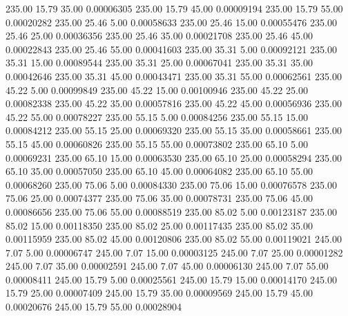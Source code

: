     235.00     15.79     35.00     0.00006305
    235.00     15.79     45.00     0.00009194
    235.00     15.79     55.00     0.00020282
    235.00     25.46      5.00     0.00058633
    235.00     25.46     15.00     0.00055476
    235.00     25.46     25.00     0.00036356
    235.00     25.46     35.00     0.00021708
    235.00     25.46     45.00     0.00022843
    235.00     25.46     55.00     0.00041603
    235.00     35.31      5.00     0.00092121
    235.00     35.31     15.00     0.00089544
    235.00     35.31     25.00     0.00067041
    235.00     35.31     35.00     0.00042646
    235.00     35.31     45.00     0.00043471
    235.00     35.31     55.00     0.00062561
    235.00     45.22      5.00     0.00099849
    235.00     45.22     15.00     0.00100946
    235.00     45.22     25.00     0.00082338
    235.00     45.22     35.00     0.00057816
    235.00     45.22     45.00     0.00056936
    235.00     45.22     55.00     0.00078227
    235.00     55.15      5.00     0.00084256
    235.00     55.15     15.00     0.00084212
    235.00     55.15     25.00     0.00069320
    235.00     55.15     35.00     0.00058661
    235.00     55.15     45.00     0.00060826
    235.00     55.15     55.00     0.00073802
    235.00     65.10      5.00     0.00069231
    235.00     65.10     15.00     0.00063530
    235.00     65.10     25.00     0.00058294
    235.00     65.10     35.00     0.00057050
    235.00     65.10     45.00     0.00064082
    235.00     65.10     55.00     0.00068260
    235.00     75.06      5.00     0.00084330
    235.00     75.06     15.00     0.00076578
    235.00     75.06     25.00     0.00074377
    235.00     75.06     35.00     0.00078731
    235.00     75.06     45.00     0.00086656
    235.00     75.06     55.00     0.00088519
    235.00     85.02      5.00     0.00123187
    235.00     85.02     15.00     0.00118350
    235.00     85.02     25.00     0.00117435
    235.00     85.02     35.00     0.00115959
    235.00     85.02     45.00     0.00120806
    235.00     85.02     55.00     0.00119021
    245.00      7.07      5.00     0.00006747
    245.00      7.07     15.00     0.00003125
    245.00      7.07     25.00     0.00001282
    245.00      7.07     35.00     0.00002591
    245.00      7.07     45.00     0.00006130
    245.00      7.07     55.00     0.00008411
    245.00     15.79      5.00     0.00025561
    245.00     15.79     15.00     0.00014170
    245.00     15.79     25.00     0.00007409
    245.00     15.79     35.00     0.00009569
    245.00     15.79     45.00     0.00020676
    245.00     15.79     55.00     0.00028904
